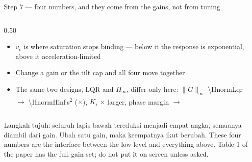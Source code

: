 \documentclass[aspectratio=169,11pt,t]{beamer}
\begin{document}
\begin{frame}{Step 7 --- four numbers, and they come from the gains, not from tuning}
  \begin{columns}[T,onlytextwidth]
    \begin{column}{0.50\textwidth}
      \begin{itemize}\bulletgap\scriptsize
        \item $v_c$ is where saturation stops binding --- below it the response
              is exponential, above it acceleration-limited
        \item Change a gain or the tilt cap and all four move together
        \item The same two designs, LQR and $H_\infty$, differ only here:
              $\|G\|_\infty$ \num{\HnormLqr} $\rightarrow$ \num{\HnormHinf}\,s\textsuperscript{2}
              (\HnormRatio$\times$), $K_i$ \KiRatio$\times$ larger, phase margin
              \PmLqr\textdegree{} $\rightarrow$ \PmHinf\textdegree
      \end{itemize}
    \end{column}
  \end{columns}
    {Langkah tujuh: seluruh lapis bawah tereduksi menjadi empat angka, semuanya diambil dari gain. Ubah satu gain, maka keempatnya ikut berubah.}
    {These four numbers are the interface between the low level and
        everything above. Table 1 of the paper has the full gain set; do not put
        it on screen unless asked.}
\end{frame}
\end{document}
